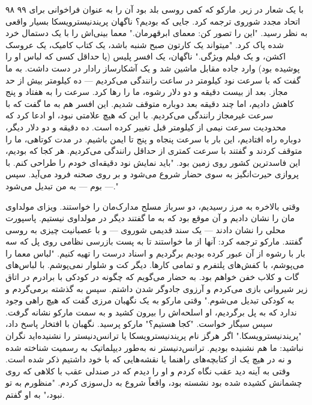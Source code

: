 ۹۸ ۹۹  
با یک شعار در زیر. مارکو که کمی روسی بلد بود آن را به عنوان فراخوانی برای اتحاد مجدد شوروی ترجمه کرد. جایی که بودیم؟ ناگهان پریندنیسترویسکا بسیار واقعی به نظر رسید.  
"این را تصور کن: معمای ابرقهرمان." معما بینی‌اش را با یک دستمال خرد شده پاک کرد. "میتواند یک کارتون صبح شنبه باشد، یک کتاب کامیک، یک عروسک اکشن، و یک فیلم ویژگی."  
ناگهان، یک افسر پلیس (یا حداقل کسی که لباس او را پوشیده بود) وارد جاده مقابل ماشین شد و یک آشکارساز رادار در دست داشت. به ما گفت که با سرعت نود کیلومتر در ساعت رانندگی می‌کردیم — ده کیلومتر بیش از حد مجاز. بعد از بیست دقیقه و دو دلار رشوه، ما را رها کرد. سرعت را به هفتاد و پنج کاهش دادیم، اما چند دقیقه بعد دوباره متوقف شدیم. این افسر هم به ما گفت که با سرعت غیرمجاز رانندگی می‌کردیم. با این که هیچ علامتی نبود، او ادعا کرد که محدودیت سرعت نیمی از کیلومتر قبل تغییر کرده است.  
ده دقیقه و دو دلار دیگر، دوباره راه افتادیم، این بار با سرعت پنجاه و پنج تا ایمن باشیم. در مدت کوتاهی، ما را متوقف کردند و گفتند با سرعت کمتری از حداقل رانندگی می‌کردیم. هر کجا که بودیم، این فاسدترین کشور روی زمین بود.  
"باید نمایش نود دقیقه‌ای خودم را طراحی کنم. با پروازی حیرت‌انگیز به سوی حضار شروع می‌شود و بر روی صحنه فرود می‌آید. سپس — بوم — به من تبدیل می‌شود."  

وقتی بالاخره به مرز رسیدیم، دو سرباز مسلح مدارک‌مان را خواستند. ویزای مولداوی مان را نشان دادیم و آن موقع بود که به ما گفتند دیگر در مولداوی نیستیم. پاسپورت محلی را نشان دادند — یک سند قدیمی شوروی — و با عصبانیت چیزی به روسی گفتند. مارکو ترجمه کرد: آنها از ما خواستند تا به پست بازرسی نظامی روی پل که سه بار با رشوه از آن عبور کرده بودیم برگردیم و اسناد درست را تهیه کنیم.  
"لباس معما را می‌پوشم، با کفش‌های پلتفرم و تمامی کارها. دیگر کت و شلوار نمی‌پوشم. با لباس‌های گات و کلاب خفن خواهم بود. به حضار می‌گویم که چگونه در کودکی با برادرم در اتاق زیر شیروانی بازی می‌کردم و آرزوی جادوگر شدن داشتم. سپس به گذشته برمی‌گردم و به کودکی تبدیل می‌شوم."  
وقتی مارکو به یک نگهبان مرزی گفت که هیچ راهی وجود ندارد که به پل برگردیم، او اسلحه‌اش را بیرون کشید و به سمت مارکو نشانه گرفت. سپس سیگار خواست.  
"کجا هستیم؟" مارکو پرسید.  
نگهبان با افتخار پاسخ داد، "پریندنیسترویسکا."  
اگر هرگز نام پریندنیسترویسکا یا ترانس‌دنیستر را نشنیده‌اید نگران نباشید: ما هم نشنیده بودیم. ترانس‌دنیستر نه به‌طور دیپلماتیک به رسمیت شناخته شده و نه در هیچ یک از کتابچه‌های راهنما یا نقشه‌هایی که با خود داشتیم ذکر شده است.  
وقتی به آینه دید عقب نگاه کردم و او را دیدم که در صندلی عقب با کلاهی که روی چشمانش کشیده شده بود نشسته بود، واقعاً شروع به دل‌سوزی کردم. "منظورم به تو نبود،" به او گفتم.